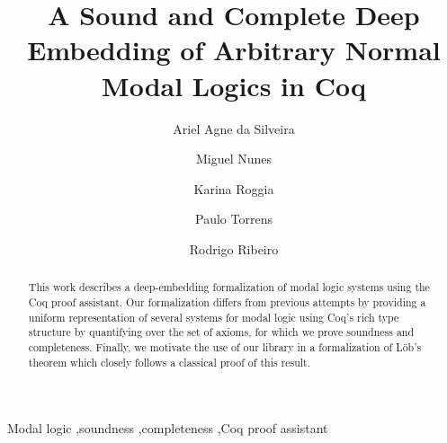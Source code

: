 \documentclass[3p,times]{elsarticle}
\begin{document}
\begin{frontmatter}



\dochead{}

\title{A Sound and Complete Deep Embedding of Arbitrary Normal Modal Logics in Coq}



\author{Ariel Agne da Silveira}
\address{Federal University of Ouro Preto}

\author{Miguel Nunes}
\address{State University of Campinas}

\author{Karina Roggia}
\address{Santa Catarina State University}

\author{Paulo Torrens}
\address{University of Kent}

\author{Rodrigo Ribeiro}
\address{Federal University of Ouro Preto}

%
\begin{abstract}
  This work describes a deep-embedding formalization of modal logic systems using the Coq proof assistant.
  Our formalization differs from previous attempts by providing a uniform
  representation of several systems for modal logic using Coq's rich type
  structure by quantifying over the set of axioms, for which we prove soundness and completeness. Finally, we motivate the use of our library in a formalization of
  L\"ob's theorem which closely follows a classical proof of this result.
\end{abstract}

\begin{keyword}
Modal logic \sep soundness \sep completeness \sep Coq proof assistant
\end{keyword}

\end{frontmatter}
\end{document}
